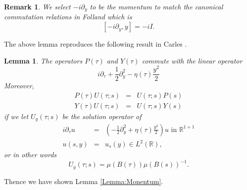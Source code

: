 \documentclass[reqno]{amsart}
\theoremstyle{plain}
\newtheorem{lemma}{Lemma}
\newtheorem{remark}{Remark}
\numberwithin{equation}{section}
\begin{document}
\begin{remark}
We select $-i\partial _{y}$ to be the momentum to match the canonical
commutation relations in Folland \cite{Folland} which is 
\begin{equation*}
\left[ -i\partial _{y},y\right] =-iI.
\end{equation*}
\end{remark}

The above lemma reproduces the following result in Carles \cite{Carles}.

\begin{lemma}
\cite{Carles} The operators $P(\tau )$ and $Y(\tau )$ commute with the
linear operator 
\begin{equation*}
i\partial _{\tau }+\frac{1}{2}\partial _{y}^{2}-\eta (\tau )\frac{y^{2}}{2}
\end{equation*}Moreover, 
\begin{eqnarray*}
P(\tau )U(\tau ;s) &=&U(\tau ;s)P(s) \\
Y(\tau )U(\tau ;s) &=&U(\tau ;s)Y(s)
\end{eqnarray*}if we let $U_{y}(\tau ;s)$ be the solution operator of 
\begin{eqnarray*}
i\partial _{\tau }u &=&\left( -\frac{1}{2}\partial _{y}^{2}+\eta (\tau )\frac{y^{2}}{2}\right) u\text{ in }\mathbb{R}^{1+1} \\
u(s,y) &=&u_{s}(y)\in L^{2}(\mathbb{R}),
\end{eqnarray*}or in other words\begin{equation*}
U_{y}(\tau ;s)=\mu \left( B(\tau )\right) \mu \left( B(s)\right) ^{-1}.
\end{equation*}
\end{lemma}

Thence we have shown Lemma \ref{Lemma:Monentum}.
\end{document}
